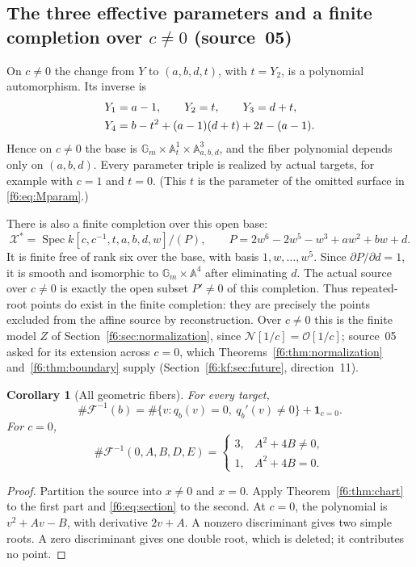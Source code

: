 \documentclass[11pt,a4paper]{article}
\newtheorem{corollary}[theorem]{Corollary}
\theoremstyle{definition}
\newcommand{\A}{\mathbb A}
\newcommand{\Gm}{\mathbb G_m}
\newcommand{\Spec}{\operatorname{Spec}}
\newcommand{\F}{\mathcal F}
\newcommand{\normal}{\mathcal N}
\newcommand{\ord}{\mathcal O}
\newcommand{\src}[1]{\textup{(source~#1)}}
\begin{document}
\subsection{The three effective parameters and a finite completion
over \texorpdfstring{$c\ne0$}{c nonzero} \src{05}}
\label{f6:kf:sec:parameters}
On $c\ne0$ the change from $Y$ to $(a,b,d,t)$, with $t=Y_2$, is a polynomial
automorphism. Its inverse is
\begin{align}
Y_1&=a-1,\qquad Y_2=t,\qquad Y_3=d+t,\notag\\
Y_4&=b-t^2+(a-1)(d+t)+2t-(a-1).\label{f6:kf:eq:Yinv}
\end{align}
Hence on $c\ne0$ the base is $\Gm\times\A^1_t\times\A^3_{a,b,d}$, and the
fiber polynomial depends only on $(a,b,d)$. Every parameter triple is
realized by actual targets, for example with $c=1$ and $t=0$. (This $t$ is
the parameter of the omitted surface in \eqref{f6:eq:Mparam}.)

There is also a finite completion over this open base:
\begin{equation}\label{f6:kf:eq:completion}
 \mathcal X^*=\Spec k[c,c^{-1},t,a,b,d,w]/(P),\qquad
 P=2w^6-2w^5-w^3+aw^2+bw+d .
\end{equation}
It is finite free of rank six over the base, with basis $1,w,\dots,w^5$.
Since $\partial P/\partial d=1$, it is smooth and isomorphic to
$\Gm\times\A^4$ after eliminating $d$. The actual source over $c\ne0$ is
exactly the open subset $P'\ne0$ of this completion. Thus repeated-root
points do exist in the finite completion: they are precisely the points
excluded from the affine source by reconstruction. Over $c\ne0$ this is the
finite model $Z$ of Section~\ref{f6:sec:normalization}, since
$\normal[1/c]=\ord[1/c]$; source~05 asked for its extension across $c=0$,
which Theorems~\ref{f6:thm:normalization} and~\ref{f6:thm:boundary} supply
(Section~\ref{f6:kf:sec:future}, direction~11).

\begin{corollary}[All geometric fibers]\label{f6:cor:count}
For every target,
\begin{equation}\label{f6:eq:count}
 \#\F^{-1}(b)=\#\{v:q_b(v)=0,\ q_b'(v)\ne0\}+\mathbf1_{c=0}.
\end{equation}
For $c=0$,
\begin{equation}\label{f6:eq:c0count}
 \#\F^{-1}(0,A,B,D,E)=
 \begin{cases}3,&A^2+4B\ne0,\\1,&A^2+4B=0.\end{cases}
\end{equation}
\end{corollary}
\begin{proof}
Partition the source into $x\ne0$ and $x=0$. Apply
Theorem~\ref{f6:thm:chart} to the first part and \eqref{f6:eq:section} to the
second. At $c=0$, the polynomial is $v^2+Av-B$, with derivative $2v+A$.
A nonzero discriminant gives two simple roots. A zero discriminant gives
one double root, which is deleted; it contributes no point.
\end{proof}
\end{document}
